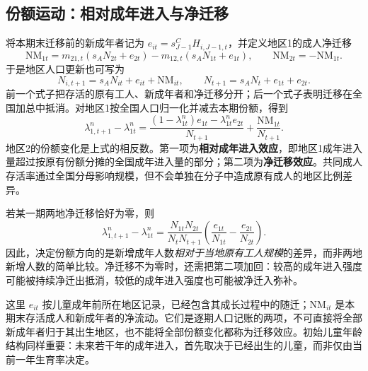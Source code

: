 \documentclass[UTF8,a4paper,zihao=-4,fontset=windows]{ctexart}
\numberwithin{equation}{section}
\begin{document}
\subsection{份额运动：相对成年进入与净迁移}
将本期末迁移前的新成年者记为 $e_{it}=s^C_{J-1}H_{i,J-1,t}$，并定义地区1的成人净迁移
\begin{equation}
 \mathrm{NM}_{1t}=m_{21,t}(s_AN_{2t}+e_{2t})
 -m_{12,t}(s_AN_{1t}+e_{1t}),\qquad
 \mathrm{NM}_{2t}=-\mathrm{NM}_{1t}.
 \label{eq:two-region-net-migration}
\end{equation}
于是地区人口更新也可写为
\begin{equation}
 N_{i,t+1}=s_AN_{it}+e_{it}+\mathrm{NM}_{it},\qquad
 N_{t+1}=s_AN_t+e_{1t}+e_{2t}.
\end{equation}
前一个式子把存活的原有工人、新成年者和净迁移分开；后一个式子表明迁移在全国加总中抵消。对地区1按全国人口归一化并减去本期份额，得到
\begin{equation}
 \lambda^n_{1,t+1}-\lambda^n_{1t}
 =\frac{(1-\lambda^n_{1t})e_{1t}-\lambda^n_{1t}e_{2t}}
 {N_{t+1}}+\frac{\mathrm{NM}_{1t}}{N_{t+1}}.
 \label{eq:two-region-share-law}
\end{equation}
地区2的份额变化是上式的相反数。第一项为\textbf{相对成年进入效应}，即地区1成年进入量超过按原有份额分摊的全国成年进入量的部分；第二项为\textbf{净迁移效应}。共同成人存活率通过全国分母影响规模，但不会单独在分子中造成原有成人的地区比例差异。

若某一期两地净迁移恰好为零，则
\begin{equation}
 \lambda^n_{1,t+1}-\lambda^n_{1t}
 =\frac{N_{1t}N_{2t}}{N_tN_{t+1}}
 \left(\frac{e_{1t}}{N_{1t}}-\frac{e_{2t}}{N_{2t}}\right).
 \label{eq:relative-entrant-share-effect}
\end{equation}
因此，决定份额方向的是新增成年人数\emph{相对于当地原有工人规模}的差异，而非两地新增人数的简单比较。净迁移不为零时，还需把第二项加回：较高的成年进入强度可能被持续净迁出抵消，较低的成年进入强度也可能被净迁入弥补。

这里 $e_{it}$ 按儿童成年前所在地区记录，已经包含其成长过程中的随迁；$\mathrm{NM}_{it}$ 是本期末存活成人和新成年者的净流动。它们是逐期人口记账的两项，不可直接将全部新成年者归于其出生地区，也不能将全部份额变化都称为迁移效应。初始儿童年龄结构同样重要：未来若干年的成年进入，首先取决于已经出生的儿童，而非仅由当前一年生育率决定。
\end{document}

